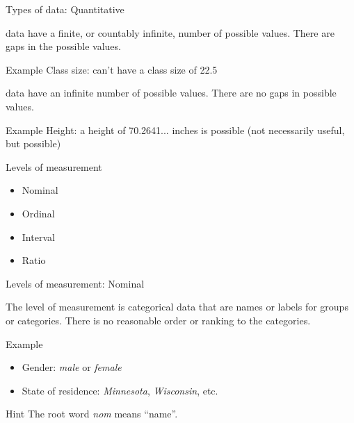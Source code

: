 \documentclass[xcolor=table, aspectratio=169, bigger, handout]{beamer}
\begin{document}
\begin{frame}{Types of data: Quantitative}
\begin{block}{}
 data have a finite, or countably infinite, number of possible values. There are gaps in the possible values.
\end{block}

\begin{exampleblock}{Example}
Class size: can't have a class size of 22.5
\end{exampleblock}
\pause
\begin{block}{}
 data have an infinite number of possible values. There are no gaps in possible values.
\end{block}

\begin{exampleblock}{Example}
Height: a height of 70.2641... inches is possible (not necessarily useful, but possible)
\end{exampleblock}

\end{frame}

\begin{frame}{Levels of measurement}
\begin{block}{}
\begin{itemize}
\item Nominal
\item Ordinal
\item Interval
\item Ratio
\end{itemize}
\end{block}
\end{frame}


\begin{frame}{Levels of measurement: Nominal}
\begin{block}{}
The  level of measurement is categorical data that are names or labels for groups or categories. There is no reasonable order or ranking to the categories.
\end{block}
\pause
\begin{exampleblock}{Example}
\begin{itemize}
\item Gender: \emph{male} or \emph{female}
\item State of residence: \emph{Minnesota}, \emph{Wisconsin}, etc.
\end{itemize}
\end{exampleblock}
\pause
\begin{alertblock}{Hint}
The root word \emph{nom} means ``name''.
\end{alertblock}
\end{frame}
\end{document}
